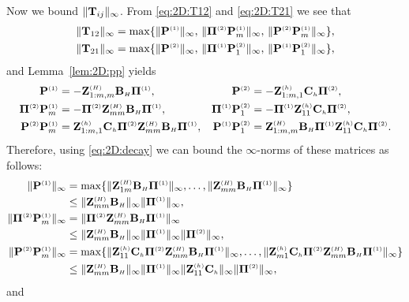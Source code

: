 Now we bound $\|\T_{ij}\|_{\infty}$.
From \eqref{eq:2D:T12} and \eqref{eq:2D:T21} we see that
%
\begin{align}
\|\T_{12}\|_{\infty} &=\max\{ \|\POne\|_{\infty},\,
\|\PiTwo\POne_{m}\|_{\infty},\,
\|\PTwo \POne_{m}\|_{\infty}\},\label{eq:2D:T12a}\\
\|\T_{21}\|_{\infty} &=\max\{ \|\PTwo\|_{\infty},\, \|\PiOne\PTwo_1\|_{\infty},\,
\|\POne\PTwo_1\|_{\infty}\},\label{eq:2D:T21a}
\end{align}
%
and Lemma~\ref{lem:2D:pp} yields
%
\begin{align*}
\POne &= -\Z_{1:m,m}^{\klein{(H)}}\matBH \PiOne,
&
\PTwo &= -\Z_{1:m,1}^{\klein{(h)}}\matCh \PiTwo,
\\
\PiTwo\POne_{m} &=-\PiTwo \Z_{mm}^{\klein{(H)}}\matBH \PiOne,
&
\PiOne\PTwo_1 &=-\PiOne \Z_{11}^{\klein{(h)}}\matCh \PiTwo,
\\
\PTwo \POne_{m} &= \Z_{1:m,1}^{\klein{(h)}} \matCh \PiTwo \Z_{mm}^{\klein{(H)}}
\matBH \PiOne,
&
\POne \PTwo_1 &= \Z_{1:m,m}^{\klein{(H)}}\matBH \PiOne \Z_{11}^{\klein{(h)}}
\matCh\PiTwo.
\end{align*}
%
Therefore, using \eqref{eq:2D:decay} we can bound the $\infty$-norms of these
matrices as follows:
%
\begin{align*}
\|\POne\|_{\infty} & = \max\{ \|\Z_{1m}^{\klein{(H)}}\matBH\PiOne\|_{\infty},
\dots, \|\Z_{mm}^{\klein{(H)}}\matBH\PiOne\|_{\infty} \}\\
&\leq \|\Z_{mm}^{\klein{(H)}}\matBH\|_{\infty} \| \PiOne \|_{\infty},\\
\|\PiTwo\POne_{m}\|_{\infty} &=
\|\PiTwo \Z_{mm}^{\klein{(H)}}\matBH\PiOne\|_{\infty}\\
&\leq \|\Z_{mm}^{\klein{(H)}}\matBH\|_{\infty} \|\PiOne\|_{\infty}
\|\PiTwo\|_{\infty},\\
\|\PTwo \POne_{m}\|_{\infty} &= \max\{ \|\Z_{11}^{\klein{(h)}}\matCh \PiTwo
\Z_{mm}^{\klein{(H)}}\matBH \PiOne\|_{\infty},
\dots,\|\Z_{m1}^{\klein{(h)}}\matCh\PiTwo \Z_{mm}^{\klein{(H)}}\matBH
\PiOne\|_{\infty} \}\\
&\leq \|\Z_{mm}^{\klein{(H)}}\matBH\|_{\infty} \|\PiOne\|_{\infty}
\|\Z_{11}^{\klein{(h)}}\matCh\|_{\infty}   \|\PiTwo\|_{\infty},
\end{align*}
%
and
%
